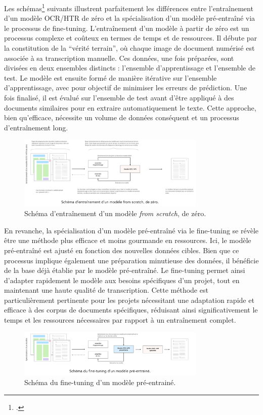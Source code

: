 \documentclass[a4paper,12pt,twoside]{book}
\begin{document}
	Les schémas\footcite{vidal-gorene_reconnaissance_2023} suivants illustrent parfaitement les différences entre l’entraînement d’un modèle OCR/HTR de zéro et la spécialisation d’un modèle pré-entraîné via le processus de fine-tuning. L’entraînement d’un modèle à partir de zéro est un processus complexe et coûteux en termes de temps et de ressources. Il débute par la constitution de la “vérité terrain”, où chaque image de document numérisé est associée à sa transcription manuelle. Ces données, une fois préparées, sont divisées en deux ensembles distincts : l’ensemble d’apprentissage et l’ensemble de test. Le modèle est ensuite formé de manière itérative sur l’ensemble d’apprentissage, avec pour objectif de minimiser les erreurs de prédiction. Une fois finalisé, il est évalué sur l’ensemble de test avant d’être appliqué à des documents similaires pour en extraire automatiquement le texte. Cette approche, bien qu’efficace, nécessite un volume de données conséquent et un processus d’entraînement long.
	\\
	\begin{figure}[h!]
		\centering
		\includegraphics[width=0.8\textwidth]{images/schem_scratch_0.png}
		\caption{Schéma d’entraînement d’un modèle \textit{from scratch}, de zéro.}
		\label{fig:monimage}
	\end{figure}
	
	En revanche, la spécialisation d’un modèle pré-entraîné via le fine-tuning se révèle être une méthode plus efficace et moins gourmande en ressources. Ici, le modèle pré-entraîné est ajusté en fonction des nouvelles données cibles. Bien que ce processus implique également une préparation minutieuse des données, il bénéficie de la base déjà établie par le modèle pré-entraîné. Le fine-tuning permet ainsi d’adapter rapidement le modèle aux besoins spécifiques d’un projet, tout en maintenant une haute qualité de transcription. Cette méthode est particulièrement pertinente pour les projets nécessitant une adaptation rapide et efficace à des corpus de documents spécifiques, réduisant ainsi significativement le temps et les ressources nécessaires par rapport à un entraînement complet.
	\\
	\begin{figure}[h!]
		\centering
		\includegraphics[width=0.8\textwidth]{images/schem_pretrain.png}
		\caption{Schéma du fine-tuning d’un modèle pré-entrainé. }
		\label{fig:monimage}
	\end{figure}
	
\end{document}
